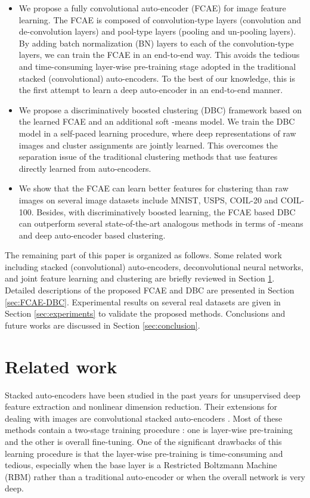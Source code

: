 \documentclass[preprint,12pt]{elsarticle}
\begin{document}
\begin{itemize}
\item We propose a fully convolutional auto-encoder (FCAE) for image feature learning. The FCAE is composed of
convolution-type layers (convolution and de-convolution layers) and pool-type layers (pooling and un-pooling layers).
By adding batch normalization (BN) layers to each of the convolution-type layers, we can train the FCAE in
an end-to-end way. This avoids the tedious and time-consuming layer-wise pre-training stage adopted in the
traditional stacked (convolutional) auto-encoders. To the best of our knowledge, this is the first attempt to learn
a deep auto-encoder in an end-to-end manner.
\item We propose a discriminatively boosted clustering (DBC) framework based on the learned FCAE and an additional
soft -means model. We train the DBC model in a self-paced learning procedure, where deep representations of
raw images and cluster assignments are jointly learned. This overcomes the separation issue of the traditional
clustering methods that use features directly learned from auto-encoders.
\item We show that the FCAE can learn better features for clustering than raw images on several image datasets
include MNIST, USPS, COIL-20 and COIL-100. Besides, with discriminatively boosted learning, the FCAE based DBC
can outperform several state-of-the-art analogous methods in terms of -means and deep auto-encoder based clustering.
\end{itemize}

The remaining part of this paper is organized as follows. Some related work including stacked (convolutional)
auto-encoders, deconvolutional neural networks, and joint feature learning and clustering are briefly reviewed
in Section \ref{sec:related-work}. Detailed descriptions of the proposed FCAE and DBC are presented in Section \ref{sec:FCAE-DBC}.
Experimental results on several real datasets are given in Section \ref{sec:experiments} to validate the proposed methods.
Conclusions and future works are discussed in Section \ref{sec:conclusion}.

\section{Related work}
\label{sec:related-work}


Stacked auto-encoders \cite{Vincent2010SDAE,Baldi2012auto-encoders,Bengio2013review,Hinton2006DBN,Hinton2006RBM,Bengio2007layerwise}
have been studied in the past years for unsupervised deep feature extraction and nonlinear dimension reduction.
Their extensions for dealing with images are convolutional stacked auto-encoders \cite{Masci2011SCAE,Lee2009CDBN}.
Most of these methods contain a two-stage training procedure \cite{Bengio2007layerwise}: one is layer-wise pre-training
and the other is overall fine-tuning. One of the significant drawbacks of this learning procedure is that the layer-wise
pre-training is time-consuming and tedious, especially when the base layer is a Restricted Boltzmann Machine (RBM)
rather than a traditional auto-encoder or when the overall network is very deep.
\end{document}
